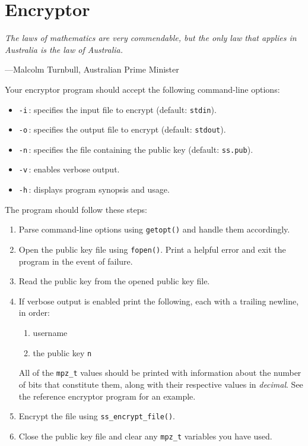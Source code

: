 \section{Encryptor}
\epigraph{\emph{The laws of mathematics are very commendable, but the only law that
applies in Australia is the law of Australia.}}{---Malcolm Turnbull, Australian Prime Minister}

Your encryptor program should accept the following command-line options:
\begin{itemize}
  \item \texttt{-i}\,: specifies the input file to encrypt (default:
    \texttt{stdin}).
  \item \texttt{-o}\,: specifies the output file to encrypt (default:
    \texttt{stdout}).
  \item \texttt{-n}\,: specifies the file containing the public key
    (default: \texttt{ss.pub}).
  \item \texttt{-v}\,: enables verbose output.
  \item \texttt{-h}\,: displays program synopsis and usage.
\end{itemize}
The program should follow these steps:
\begin{enumerate}
  \item Parse command-line options using \texttt{getopt()} and handle
    them accordingly.
  \item Open the public key file using \texttt{fopen()}. Print a helpful
    error and exit the program in the event of failure.
  \item Read the public key from the opened public key file.
  \item If verbose output is enabled print the following, each with a
    trailing newline, in order:
    \begin{enumerate}
      \item username
      \item the public key \texttt{n}
    \end{enumerate}
    All of the \texttt{mpz\_t} values should be printed with information
    about the number of bits that constitute them, along with their
    respective values in \emph{decimal}. See the reference encryptor
    program for an example.
  \item Encrypt the file using \texttt{ss\_encrypt\_file()}.
  \item Close the public key file and clear any \texttt{mpz\_t}
    variables you have used.
\end{enumerate}
